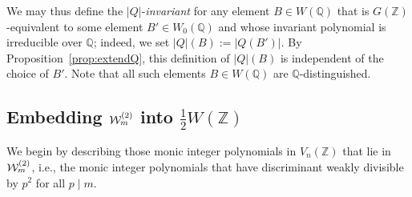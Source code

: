 \documentclass[11pt]{article}
\def\Z{{\mathbb Z}}
\def\Q{{\mathbb Q}}
\def\U{{\mathcal W}}
\def\Vmn{{V_n}}
\def\Z{{\mathbb Z}}
\def\Q{{\mathbb Q}}
\def\w{{\rm {(2)}}}
\begin{document}
We may thus define the $|Q|$-{\it invariant} for any element $B\in
W(\Q)$ that is $G(\Z)$-equivalent to some element $B'\in W_0(\Q)$ and
whose invariant polynomial is irreducible over $\Q$; indeed, we set
$|Q|(B):=|Q(B')|$. By Proposition~\ref{prop:extendQ}, this definition
of $|Q|(B)$ is independent of the choice of $B'$. Note that all such
elements $B\in W(\Q)$ are $\Q$-distinguished.

\subsection{Embedding $\U_m^\w$ into $\frac12W(\Z)$}\label{sembedodd}

We begin by describing those monic integer polynomials in $\Vmn(\Z)$
that lie in $\U_m^\w$, i.e., the monic integer polynomials that have
discriminant weakly divisible by $p^2$ for all $p\mid m$.
\end{document}
